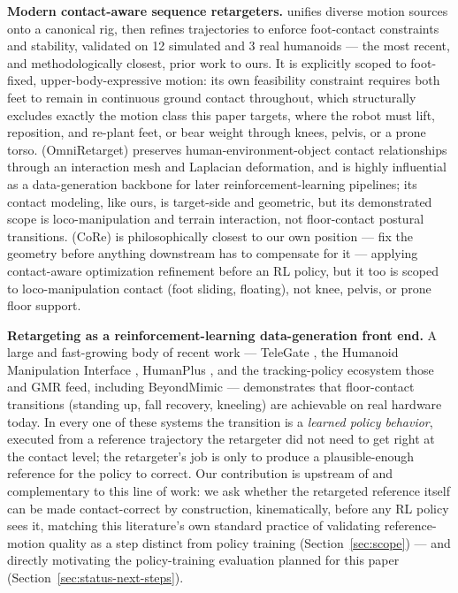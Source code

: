 \noindent\textbf{Modern contact-aware sequence retargeters.}
\cite{jeong2025rigunification} unifies diverse motion sources onto a
canonical rig, then refines trajectories to enforce foot-contact constraints
and stability, validated on 12 simulated and 3 real humanoids --- the most
recent, and methodologically closest, prior work to ours. It is explicitly
scoped to foot-fixed, upper-body-expressive motion: its own feasibility
constraint requires both feet to remain in continuous ground contact
throughout, which structurally excludes exactly the motion class this paper
targets, where the robot must lift, reposition, and re-plant feet, or bear
weight through knees, pelvis, or a prone torso. \cite{yang2025omniretarget}
(OmniRetarget) preserves human-environment-object contact relationships
through an interaction mesh and Laplacian deformation, and is highly
influential as a data-generation backbone for later reinforcement-learning
pipelines; its contact modeling, like ours, is target-side and geometric,
but its demonstrated scope is loco-manipulation and terrain interaction, not
floor-contact postural transitions. \cite{jeong2025core} (CoRe) is
philosophically closest to our own position --- fix the geometry before
anything downstream has to compensate for it --- applying contact-aware
optimization refinement before an RL policy, but it too is scoped to
loco-manipulation contact (foot sliding, floating), not knee, pelvis, or
prone floor support.

\noindent\textbf{Retargeting as a reinforcement-learning data-generation
front end.} A large and fast-growing body of recent work --- TeleGate
\cite{li2026telegate}, the Humanoid Manipulation Interface
\cite{nai2026humi}, HumanPlus \cite{fu2024humanplus}, and the tracking-policy
ecosystem those and GMR feed, including BeyondMimic
\cite{liao2025beyondmimic} --- demonstrates that floor-contact transitions
(standing up, fall recovery, kneeling) are achievable on real hardware
today. In every one of these systems the transition is a \textit{learned
policy behavior}, executed from a reference trajectory the retargeter did
not need to get right at the contact level; the retargeter's job is only to
produce a plausible-enough reference for the policy to correct. Our
contribution is upstream of and complementary to this line of work: we ask
whether the retargeted reference itself can be made contact-correct by
construction, kinematically, before any RL policy sees it, matching this
literature's own standard practice of validating reference-motion quality
as a step distinct from policy training (Section~\ref{sec:scope}) --- and
directly motivating the policy-training evaluation planned for this paper
(Section~\ref{sec:status-next-steps}).

